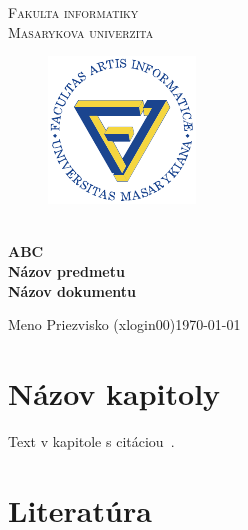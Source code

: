 \documentclass[11pt,a4paper]{article}
\begin{document}
\begin{titlepage}
    \begin{center}
        \Huge{
            \textsc{
                Fakulta informatiky\\
                \hspace{33px}Masarykova univerzita
            }
        }
        \vspace{50px}
        \begin{figure}[!h]
            \centering
            \includegraphics[scale=3]{muni-fi-logo.pdf}
        \end{figure}
        \\[15mm]
        \Huge{
            \textbf{
                ABC
            }
        }
        \\[1.5mm]
        \huge{
            \textbf{
                Názov predmetu
            }
        }
        \\[2.5em]
        \LARGE{
            \textbf{
                Názov dokumentu
            }
        }
        \vfill
    \end{center}
        \Large{
            Meno Priezvisko (xlogin00)\hfill \today
        }

\end{titlepage}

\setlength{\parskip}{0pt}
    \hypersetup{hidelinks}\tableofcontents
\setlength{\parskip}{0pt}

\newpage

\section{Názov kapitoly}

Text v kapitole s citáciou~\cite{BOOK}.

\newpage

\section{Literatúra}

\begin{flushleft}
    
\end{flushleft}
\end{document}
